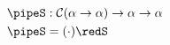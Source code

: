 \documentclass[preview]{standalone}
\begin{document}
\begin{align*}
  \pipeS &: \mathcal{C}(\alpha \rightarrow \alpha) \rightarrow \alpha \rightarrow \alpha \\
  \pipeS &= (\cdot) \redS
\end{align*}
\end{document}
